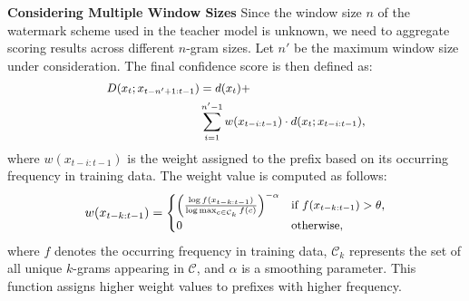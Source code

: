 \noindent\textbf{Considering Multiple Window Sizes} \quad Since the window size $n$ of the watermark scheme used in the teacher model is unknown, we need to aggregate scoring results across different $n$-gram sizes. Let $n'$ be the maximum window size under consideration. The final confidence score is then defined as:
\begin{equation}
\small
\begin{aligned}
    D(x_t; x_{t-n'+1:t-1}) &= d(x_t) + \\
    &\sum_{i=1}^{n'-1} w(x_{t-i:t-1}) \cdot d(x_t; x_{t-i:t-1}),
\end{aligned}
\end{equation}
where $w(x_{t-i:t-1})$ is the weight assigned to the prefix based on its occurring frequency in training data. The weight value is computed as follows:
\begin{equation}
\small
w(x_{t-k:t-1}) = \begin{cases}
\left(\frac{\log f(x_{t-k:t-1})}{\log \max_{c \in \mathcal{C}_k} f(c)}\right)^{-\alpha} & \text{if } f(x_{t-k:t-1}) > \theta, \\
0 & \text{otherwise},
\end{cases}
\end{equation}
where $f$ denotes the occurring frequency in training data, $\mathcal{C}_k$ represents the set of all unique $k$-grams appearing in $\mathcal{C}$, and $\alpha$ is a smoothing parameter. This function assigns higher weight values to prefixes with higher frequency. 

